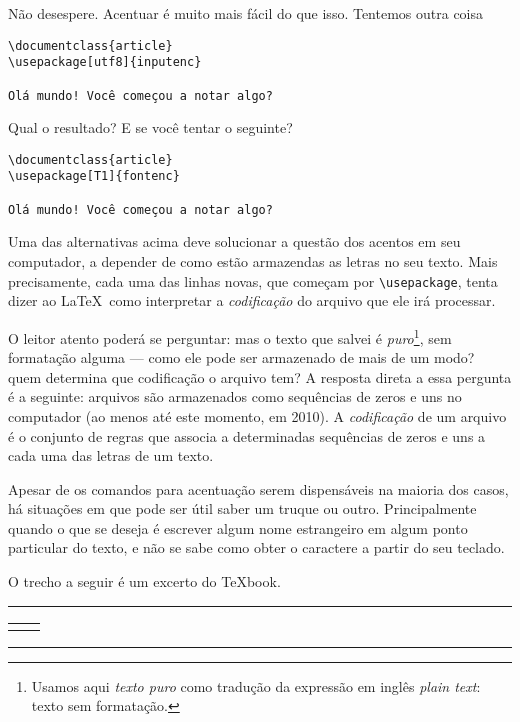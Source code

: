 Não desespere. Acentuar é muito mais fácil do que isso. Tentemos outra
coisa
\begin{footnotesize}
\begin{verbatim}
\documentclass{article}
\usepackage[utf8]{inputenc}

Olá mundo! Você começou a notar algo?

\end{verbatim}
\end{footnotesize}

Qual o resultado? E se você tentar o seguinte?
\begin{footnotesize}
\begin{verbatim}
\documentclass{article}
\usepackage[T1]{fontenc}

Olá mundo! Você começou a notar algo?

\end{verbatim}
\end{footnotesize}

Uma das alternativas acima deve solucionar a questão dos acentos em
seu computador, a depender de como estão armazendas as letras no
seu texto. Mais precisamente, cada uma das linhas novas, que começam
por \verb'\usepackage', tenta dizer ao \LaTeX\ como interpretar a
\emph{codificação} do arquivo que ele irá processar.

\begin{detalhe}
O leitor atento poderá se perguntar: mas o texto que salvei é
\emph{puro}\footnote{Usamos aqui \emph{texto puro} como tradução da
  expressão em inglês \emph{plain text}: texto sem formatação.}, sem
formatação alguma --- como ele pode ser armazenado de mais de um modo?
quem determina que codificação o arquivo tem? 
A resposta direta a essa pergunta é a seguinte: arquivos são
armazenados como sequências de zeros e uns no computador (ao menos até
este momento, em 2010). A \emph{codificação} de um arquivo é o
conjunto de regras que associa a determinadas sequências de zeros e
uns a cada uma das letras de um texto.
\end{detalhe}

Apesar de os comandos para acentuação serem dispensáveis na maioria
dos casos, há situações em que pode ser útil saber um truque ou
outro. Principalmente quando o que se deseja é escrever algum nome
estrangeiro em algum ponto particular do texto, e não se sabe como
obter o caractere a partir do seu teclado.

O trecho a seguir é um excerto do \TeX book.

\medskip
\begin{center}\hrule\smallskip
\begin{tabular}{c|c}
\begin{minipage}{.405\textwidth}\footnotesize

\end{minipage} &
\begin{minipage}{.535\textwidth}

\end{minipage}
\end{tabular}
\smallskip\hrule
\end{center}
\medskip



